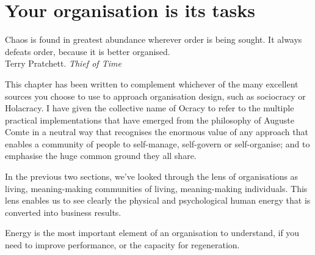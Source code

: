 ﻿\chapter{Your organisation is its tasks}
\label{chapter:who-is-your-organisation-tasks}


\begin{chapterquotation}
Chaos is found in greatest abundance wherever order is being sought. It always defeats order, because it is better organised.\\
\raggedleft\textemdash Terry Pratchett. \emph{Thief of Time}
\end{chapterquotation}


\label{section:task-role-arena}


This chapter has been written to complement whichever of the many excellent sources you choose to use to approach organisation design, such as sociocracy or Holacracy. I have given the collective name of Ocracy to refer to the multiple practical implementations that have emerged from the philosophy of Auguste Comte in a neutral way that recognises the enormous value of any approach that enables a community of people to self-manage, self-govern or self-organise; and to emphasise the huge common ground they all share.  


In the previous two sections, we've looked through the lens of organisations as living, meaning\hyp{}making communities of living, meaning\hyp{}making individuals. This lens enables us to see clearly the physical and psychological human energy that is converted into business results. 


Energy is the most important element of an organisation to understand, if you need to improve performance, or the capacity for regeneration. 


